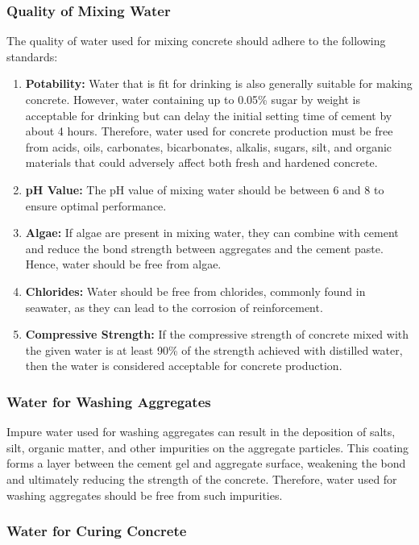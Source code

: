 \documentclass[a4paper,11pt]{book}
\begin{document}
\subsubsection*{Quality of Mixing Water}

The quality of water used for mixing concrete should adhere to the following standards:

\begin{enumerate}
    \item \textbf{Potability:} Water that is fit for drinking is also generally suitable for making concrete. However, water containing up to 0.05\% sugar by weight is acceptable for drinking but can delay the initial setting time of cement by about 4 hours. Therefore, water used for concrete production must be free from acids, oils, carbonates, bicarbonates, alkalis, sugars, silt, and organic materials that could adversely affect both fresh and hardened concrete.
    \item \textbf{pH Value:} The pH value of mixing water should be between 6 and 8 to ensure optimal performance.
    \item \textbf{Algae:} If algae are present in mixing water, they can combine with cement and reduce the bond strength between aggregates and the cement paste. Hence, water should be free from algae.
    \item \textbf{Chlorides:} Water should be free from chlorides, commonly found in seawater, as they can lead to the corrosion of reinforcement.
    \item \textbf{Compressive Strength:} If the compressive strength of concrete mixed with the given water is at least 90\% of the strength achieved with distilled water, then the water is considered acceptable for concrete production.
\end{enumerate}

\subsubsection{Water for Washing Aggregates}

Impure water used for washing aggregates can result in the deposition of salts, silt, organic matter, and other impurities on the aggregate particles. This coating forms a layer between the cement gel and aggregate surface, weakening the bond and ultimately reducing the strength of the concrete. Therefore, water used for washing aggregates should be free from such impurities.

\subsubsection{Water for Curing Concrete}
\end{document}
